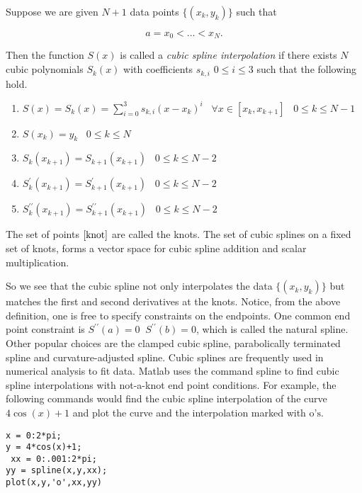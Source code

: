 \documentclass[12pt]{article}
\begin{document}
Suppose we are given $N+1$ data points $\{(x_{k},y_{k})\}$ such
that

\begin{equation}
a=x_{0}<\dots<x_{N}. \label{knot}
\end{equation}

Then the function $S(x)$ is called a \emph{cubic spline interpolation} if
there exists $N$ cubic polynomials $S_{k}(x)$ with coefficients
$s_{k,i}\,\,0\leq i\leq 3$ such that the following hold.


\begin{enumerate}
\item $S(x)=S_{k}(x)=\sum_{i=0}^{3}s_{k,i}(x-x_{k})^{i} \;  \;\;\forall x\in
[x_{k},x_{k+1}]\;\;\;0\leq k \leq N-1$
\item $S(x_{k})=y_{k}\;\;\;0\leq k \leq N$
\item $S_{k}(x_{k+1})=S_{k+1}(x_{k+1})\;\;\;0\leq k \leq N-2$
\item $S^{\prime}_{k}(x_{k+1})=S^{\prime}_{k+1}(x_{k+1})\;\;\;0\leq k \leq N-2$
\item $S^{\prime \prime}_{k}(x_{k+1})=S^{\prime \prime}_{k+1}(x_{k+1})\;\;\;0\leq k \leq N-2$
\end{enumerate}

The set of points $\eqref{knot}$ are called the knots.  The set of
cubic splines on a fixed set of knots, forms a vector space for
cubic spline addition and scalar multiplication.

So we see that the cubic spline not only interpolates the data
$\{(x_{k},y_{k})\}$ but matches the first and second derivatives
at the knots. Notice, from the above definition, one is free to
specify constraints on the endpoints. One common end point
constraint is $S^{\prime\prime}(a)=0\;\;S^{\prime\prime}(b)=0$,
which is called the natural spline. Other popular choices are the
clamped cubic spline, parabolically terminated spline and
curvature-adjusted spline. Cubic splines are frequently used in
numerical analysis to fit data. Matlab uses the command spline to
find cubic spline interpolations with not-a-knot end point
conditions. For example, the following commands would find the
cubic spline interpolation of the curve $4\cos(x)+1$ and plot the
curve and the interpolation marked with $\text{o's}$.



\begin{verbatim}
x = 0:2*pi;
y = 4*cos(x)+1;
 xx = 0:.001:2*pi;
yy = spline(x,y,xx);
plot(x,y,'o',xx,yy)
\end{verbatim}
\end{document}
